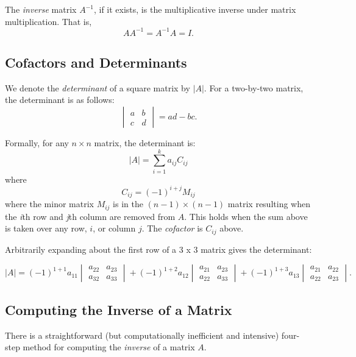 \documentclass[
]{book}
\begin{document}
The \emph{inverse} matrix \(A^{-1}\), if it exists, is the multiplicative inverse under matrix multiplication. That is,
\[A A^{-1} = A^{-1}A = I.\]

\hypertarget{cofactors-and-determinants}{%
\subsection{Cofactors and Determinants}\label{cofactors-and-determinants}}

We denote the \emph{determinant} of a square matrix by \(|A|\). For a two-by-two matrix, the determinant is as follows:
\[
\begin{vmatrix}
a & b \\
c & d
\end{vmatrix} = ad - bc.
\]

Formally, for any \(n \times n\) matrix, the determinant is:
\[|A| = \sum_{i=1}^{k}a_{ij} C_{ij} \] where
\[C_{ij} = (-1)^{i+j}M_{ij}\] where
the minor matrix \(M_{ij}\) is in the \((n-1) \times (n-1)\) matrix resulting when the \emph{i}th row and \emph{j}th column are removed from \(A\). This holds when the sum above is taken over any row, \(i\), or column \(j\). The \emph{cofactor} is \(C_{ij}\) above.

Arbitrarily expanding about the first row of a 3 x 3 matrix gives the determinant:

\[|A| = (-1)^{1+1} a_{11} \begin{vmatrix}
a_{22} & a_{23} \\
a_{32} & a_{33}
\end{vmatrix} 
+ (-1)^{1+2}a_{12} \begin{vmatrix}
a_{21} & a_{23} \\
a_{22} & a_{33}
\end{vmatrix} 
+ (-1)^{1+3}a_{13}\begin{vmatrix}
a_{21} & a_{22} \\
a_{22} & a_{23}
\end{vmatrix}.\]

\hypertarget{computing-the-inverse-of-a-matrix}{%
\subsection{Computing the Inverse of a Matrix}\label{computing-the-inverse-of-a-matrix}}

There is a straightforward (but computationally inefficient and intensive) four-step method for computing the \emph{inverse} of a matrix \(A\).
\end{document}
